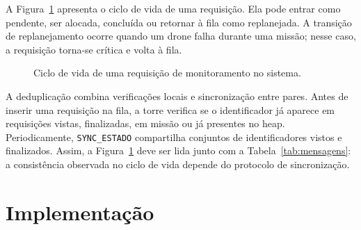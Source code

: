 \documentclass[12pt]{article}
\begin{document}
A Figura~\ref{fig:estados} apresenta o ciclo de vida de uma requisição. Ela pode entrar como pendente, ser alocada, concluída ou retornar à fila como replanejada. A transição de replanejamento ocorre quando um drone falha durante uma missão; nesse caso, a requisição torna-se crítica e volta à fila.

\begin{figure}[H]
\centering
{}
\caption{Ciclo de vida de uma requisição de monitoramento no sistema.}
\label{fig:estados}
\end{figure}

A deduplicação combina verificações locais e sincronização entre pares. Antes de inserir uma requisição na fila, a torre verifica se o identificador já aparece em requisições vistas, finalizadas, em missão ou já presentes no heap. Periodicamente, \texttt{SYNC\_ESTADO} compartilha conjuntos de identificadores vistos e finalizados. Assim, a Figura~\ref{fig:estados} deve ser lida junto com a Tabela~\ref{tab:mensagens}: a consistência observada no ciclo de vida depende do protocolo de sincronização.

\section{Implementação}
\end{document}
